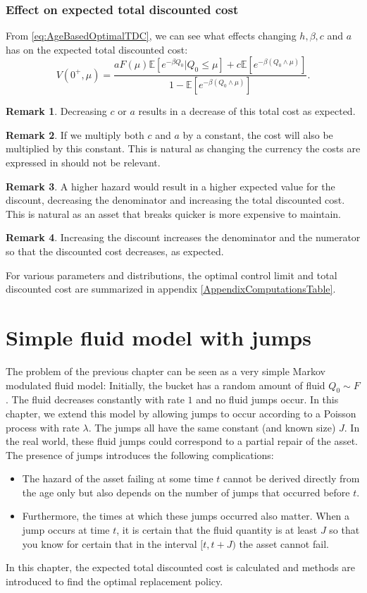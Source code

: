 \documentclass[a4paper]{thesis}
\theoremstyle{definition}
\newtheorem{remark}{Remark}[chapter]
\begin{document}
\subsection{Effect on expected total discounted cost}
From \eqref{eq:AgeBasedOptimalTDC}, we can see what effects changing $h,\beta,c$ and $a$ has on the expected total discounted cost:
\[V(0^+,\mu)=\frac{aF(\mu)\mathbb{E}[e^{-\beta Q_0}|Q_0\leq \mu]+c\mathbb{E}[e^{-\beta(Q_0\wedge\mu)}]}{1-\mathbb{E}[e^{-\beta (Q_0\wedge\mu)}]}.\]
\begin{remark}
	Decreasing $c$ or $a$ results in a decrease of this total cost as expected.
\end{remark}
\begin{remark}\label{remark:AgeBasedCostRatio}
	If we multiply both $c$ and $a$ by a constant, the cost will also be multiplied by this constant.
	This is natural as changing the currency the costs are expressed in should not be relevant.
\end{remark}
\begin{remark}
	A higher hazard would result in a higher expected value for the discount, decreasing the denominator and increasing the total discounted cost.
	This is natural as an asset that breaks quicker is more expensive to maintain.
\end{remark}
\begin{remark}\label{remark:AgeBasedTDCDiscountIncrease}
	Increasing the discount increases the denominator and the numerator so that the discounted cost decreases, as expected.
\end{remark}
For various parameters and distributions, the optimal control limit and total discounted cost are summarized in appendix \ref{AppendixComputationsTable}. 
\chapter{Simple fluid model with jumps}\label{chapter:SimpleFluid}
The problem of the previous chapter can be seen as a very simple Markov modulated fluid model:
Initially, the bucket has a random amount of fluid $Q_0\sim F$.
The fluid decreases constantly with rate $1$ and no fluid jumps occur.
In this chapter, we extend this model by allowing jumps to occur according to a Poisson process with rate $\lambda$.
The jumps all have the same constant (and known size) $J$.
In the real world, these fluid jumps could correspond to a partial repair of the asset.
The presence of jumps introduces the following complications:
\begin{itemize}
	\item The hazard of the asset failing at some time $t$ cannot be derived directly from the age only but also depends on the number of jumps that occurred before $t$.
	\item Furthermore, the times at which these jumps occurred also matter.
	When a jump occurs at time $t$, it is certain that the fluid quantity is at least $J$ so that you know for certain that in the interval $[t,t+J)$ the asset cannot fail.
\end{itemize}
In this chapter, the expected total discounted cost is calculated and methods are introduced to find the optimal replacement policy.
\end{document}
